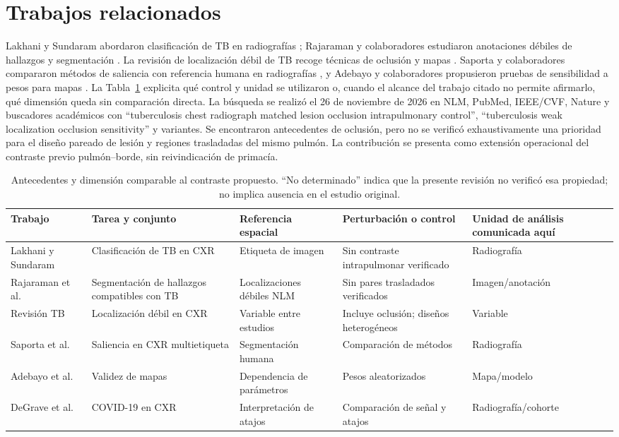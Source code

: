\documentclass[conference]{IEEEtran}
\begin{document}
\section{Trabajos relacionados}
Lakhani y Sundaram abordaron clasificación de TB en radiografías \cite{lakhani2017}; Rajaraman y colaboradores estudiaron anotaciones débiles de hallazgos y segmentación \cite{rajaraman2021}. La revisión de localización débil de TB recoge técnicas de oclusión y mapas \cite{weakreview2023}. Saporta y colaboradores compararon métodos de saliencia con referencia humana en radiografías \cite{saporta2022}, y Adebayo y colaboradores propusieron pruebas de sensibilidad a pesos para mapas \cite{adebayo2018}. La Tabla~\ref{tab:antecedentes} explicita qué control y unidad se utilizaron o, cuando el alcance del trabajo citado no permite afirmarlo, qué dimensión queda sin comparación directa. La búsqueda se realizó el 26 de noviembre de 2026 en NLM, PubMed, IEEE/CVF, Nature y buscadores académicos con ``tuberculosis chest radiograph matched lesion occlusion intrapulmonary control'', ``tuberculosis weak localization occlusion sensitivity'' y variantes. Se encontraron antecedentes de oclusión, pero no se verificó exhaustivamente una prioridad para el diseño pareado de lesión y regiones trasladadas del mismo pulmón. La contribución se presenta como extensión operacional del contraste previo pulmón--borde, sin reivindicación de primacía.

\begin{table}[t]
\caption{Antecedentes y dimensión comparable al contraste propuesto. ``No determinado'' indica que la presente revisión no verificó esa propiedad; no implica ausencia en el estudio original.}
\label{tab:antecedentes}\centering\footnotesize
\begin{tabular}{p{2.3cm}p{3.0cm}p{3.1cm}p{3.0cm}p{2.5cm}}
\toprule
Trabajo & Tarea y conjunto & Referencia espacial & Perturbación o control & Unidad de análisis comunicada aquí\\\midrule
Lakhani y Sundaram \cite{lakhani2017} & Clasificación de TB en CXR & Etiqueta de imagen & Sin contraste intrapulmonar verificado & Radiografía\\
Rajaraman et al. \cite{rajaraman2021} & Segmentación de hallazgos compatibles con TB & Localizaciones débiles NLM & Sin pares trasladados verificados & Imagen/anotación\\
Revisión TB \cite{weakreview2023} & Localización débil en CXR & Variable entre estudios & Incluye oclusión; diseños heterogéneos & Variable\\
Saporta et al. \cite{saporta2022} & Saliencia en CXR multietiqueta & Segmentación humana & Comparación de métodos & Radiografía\\
Adebayo et al. \cite{adebayo2018} & Validez de mapas & Dependencia de parámetros & Pesos aleatorizados & Mapa/modelo\\
DeGrave et al. \cite{degrave2021} & COVID-19 en CXR & Interpretación de atajos & Comparación de señal y atajos & Radiografía/cohorte\\
\bottomrule
\end{tabular}
\end{table}
\end{document}
